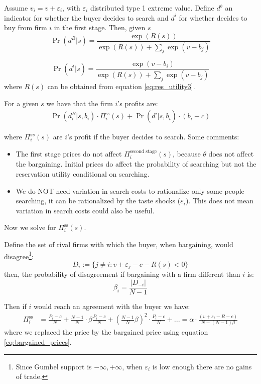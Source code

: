 \documentclass[12pt]{article}
\theoremstyle{plain}
\theoremstyle{plain}
\begin{document}


Assume $v_i = v + \varepsilon_i $, with $\varepsilon_i$ distributed type 1 extreme value. Define $d^b$ an indicator for whether the buyer decides to search and $d^i$ for whether decides to buy from firm $i$ in the first stage. Then, given $s$ 
\[
\Pr(d^B|s) = \frac{\exp(R(s))}{\exp(R(s)) + \sum_j \exp(v - b_j)}
\]


\[
\Pr(d^i|s) = \frac{\exp(v - b_i)}{\exp(R(s)) + \sum_j \exp(v - b_j)}
\]
where  $R(s)$ can be obtained from  equation \ref{eq:res_utility3}.


For a given $s$ we have that the firm $i$'s profits are: 
\begin{align}\label{eq:profits}
    \Pr(d^B_i|s,b_i) \cdot     \Pi^{\text{ss}}_i(s) + \Pr(d^i|s, b_i) \cdot (b_i - c)    
\end{align}

where $\Pi^{ss}_i(s)$ are $i$'s profit if the buyer decides to search.
Some comments: 
\begin{itemize}
    \item The first stage prices do not affect $\Pi^{\text{second stage}}_i(s)$, because $\theta$ does not affect the bargaining. Initial prices do affect the probability of searching but not the reservation utility conditional on searching.  
    \item We do NOT need variation in search costs to rationalize only some people searching, it can be rationalized by the taste shocks ($\varepsilon_i$). This does not mean variation in search costs could also be useful. 
\end{itemize}

Now we solve for $\Pi^{\text{ss}}_i(s)$. 

Define the set of rival firms with which the buyer, when bargaining, would disagree\footnote{Since Gumbel support is \( -\infty, +\infty \), when \( \varepsilon_i \) is low enough there are no gains of trade.}: 
\[
D_i := \{j \neq i : v + \varepsilon_j - c - R(s) < 0\}
\]
then, the probability of disagreement if bargaining with a firm different than $i$ is: 
$$
\beta_i = \frac{|D_{-i}|}{N - 1} 
$$



Then if $i$ would reach an agreement with the buyer we have: 
\begin{align*}
\Pi^{\text{ss}}_i &= \frac{P_i - c}{N} 
+ \frac{N - 1}{N} \cdot \beta \frac{P_i - c}{N} 
+ \left( \frac{N - 1}{N} \beta \right)^2 \cdot \frac{P_i - c}{N} + ... 
 = \alpha \cdot \frac{(v + \varepsilon_i - R - c)}{N - (N-1)\beta}
\end{align*}
where we replaced the price by the bargained price using equation \ref{eq:bargained_prices}. 
\end{document}
